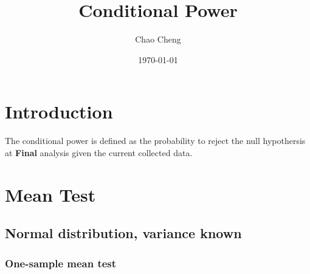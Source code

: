 \documentclass[a4paper,12pt]{article}
\title{Conditional Power}
\author{Chao Cheng}
\date{\today}
\begin{document}
\maketitle
\tableofcontents{}

\section{Introduction}
\label{sec:introduction}

The conditional power is defined as the probability to reject the null hypothersis at \textbf{Final} analysis given the current collected data.

\section{Mean Test}
\label{sec:mean-test}

\subsection{Normal distribution, variance known}
\label{sec:norm-distr-vari}

\subsubsection{One-sample mean test}
\label{sec:one-sample-mean}
\end{document}
